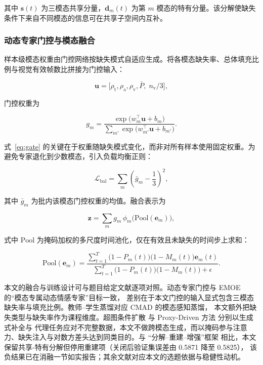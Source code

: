 \documentclass[withoutpreface,bwprint]{cumcmthesis}
\begin{document}
其中 $\bm{s}(t)$ 为三模态共享分量，$\bm{d}_m(t)$ 为第 $m$ 模态的特有分量。该分解使缺失条件下来自不同模态的信息可在共享子空间内互补。

\subsubsection{动态专家门控与模态融合}

样本级模态权重由门控网络按缺失模式自适应生成。将各模态缺失率、总体填充比例与视觉有效帧数比拼接为门控输入：

\begin{equation}
\bm{u}=\big[\rho_{\mathrm{t}},\rho_{\mathrm{a}},\rho_{\mathrm{v}},
\bar{P},\;n_{\mathrm{v}}/3\big],
\label{eq:gatein}
\end{equation}

门控权重为

\begin{equation}
g_m=\frac{\exp\!\big(w_m^{\top}\bm{u}+b_m\big)}{\sum_{m'}\exp\!\big(w_{m'}^{\top}\bm{u}+b_{m'}\big)}.
\label{eq:gate}
\end{equation}

式~\eqref{eq:gate} 的关键在于权重随缺失模式变化，而非对所有样本使用固定权重。为避免专家退化到少数模态，引入负载均衡正则：

\begin{equation}
\mathcal{L}_{\mathrm{bal}}=\sum_{m}\left(\bar{g}_m-\frac{1}{3}\right)^2,
\label{eq:balance}
\end{equation}

其中 $\bar{g}_m$ 为批内该模态门控权重的均值。融合表示为

\begin{equation}
\bm{z}=\sum_{m}g_m\,\phi_m\!\big(\mathrm{Pool}(\bm{e}_m)\big),
\label{eq:fusion}
\end{equation}

式中 $\mathrm{Pool}$ 为掩码加权的多尺度时间池化，仅在有效且未缺失的时间步上求和：

\begin{equation}
\mathrm{Pool}(\bm{e}_m)=\frac{\sum_{t=1}^{T}\big(1-P_m(t)\big)\big(1-M_m(t)\big)\bm{e}_m(t)}
{\sum_{t=1}^{T}\big(1-P_m(t)\big)\big(1-M_m(t)\big)+\epsilon}.
\label{eq:pool}
\end{equation}

本文的融合与训练设计可与题目给定文献逐项对照。动态专家门控与 EMOE 的“模态专属动态情感专家”目标一致\cite{ref17}，
差别在于本文门控的输入显式包含三模态缺失率与填充比例。教师--学生蒸馏对应 CMAD 的模态感知蒸馏\cite{ref12}，
本文额外把缺失类型与缺失率作为课程维度。超图条件扩散\cite{ref10} 与 Proxy-Driven 方法\cite{ref13} 分别以生成式补全与
代理任务应对不完整数据，本文不做跨模态生成，而以掩码参与注意力、缺失注入与对数方差头达到同类目的。与
“分解--重建--增强”框架\cite{ref11} 相比，本文保留共享-特有分解但停用重建项（关闭后验证集误差由 0.5871 降至 0.5825），
该负结果已在消融一节如实报告；其余文献对应本文的选题依据与稳健性动机\cite{ref9,ref14,ref16,ref18}。
\end{document}
